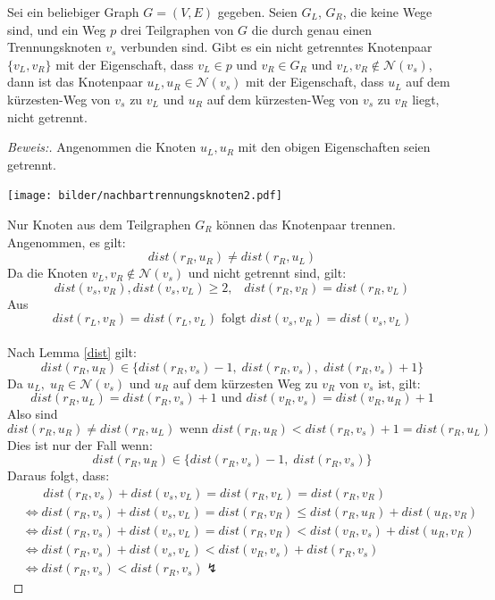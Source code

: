 \begin{lem}
\label{nachbartrennungsknoten2}
Sei ein beliebiger Graph $G=(V,E)$ gegeben. Seien $G_L$, $G_R$, die keine Wege sind, und ein Weg $p$ drei Teilgraphen von $G$ die durch genau einen Trennungsknoten $v_s$ verbunden sind. Gibt es ein nicht getrenntes Knotenpaar $\{v_L,v_R\}$ mit der Eigenschaft, dass $v_L\in p$ und $v_R \in G_R$ und $v_L, v_R \notin \mathcal{N}(v_s)$, dann ist das Knotenpaar $u_L,u_R \in \mathcal{N}(v_s)$ mit der Eigenschaft, dass $u_L$ auf dem kürzesten-Weg von $v_s$ zu $v_L$ und $u_R$ auf dem kürzesten-Weg von $v_s$ zu $v_R$ liegt, nicht getrennt.
\end{lem}
\par
\begin{proof}[Beweis:] Angenommen die Knoten $u_L,u_R$ mit den obigen Eigenschaften seien getrennt.
\begin{floatingfigure}[r]{200pt}
\centering
\texttt{[image: bilder/nachbartrennungsknoten2.pdf]}
\end{floatingfigure}
Nur Knoten aus dem Teilgraphen $G_R$ können das Knotenpaar trennen. Angenommen, es gilt: $$dist(r_R,u_R)\neq dist(r_R,u_L)$$
\newline
Da die Knoten $v_L, v_R \notin \mathcal{N}(v_s)$ und nicht getrennt sind, gilt: $$dist(v_s,v_R),dist(v_s,v_L)\geq 2,\;\;\; dist(r_R,v_R)=dist(r_R,v_L)$$ 
Aus $$dist(r_L,v_R)=dist(r_L,v_L) \text{ folgt }dist(v_s,v_R)=dist(v_s,v_L)$$\\
Nach Lemma \ref{dist} gilt: $$dist(r_R,u_R)\in \{dist(r_R,v_s)-1,\; dist(r_R,v_s),\;dist(r_R,v_s)+1\}$$
Da $u_L,\;u_R \in \mathcal{N}(v_s)$ und $u_R$ auf dem kürzesten Weg zu $v_R$ von $v_s$ ist, gilt: $$dist(r_R,u_L)=dist(r_R,v_s)+1\text{ und }dist(v_R,v_s)=dist(v_R,u_R)+1$$
Also sind $$dist(r_R,u_R)\neq dist(r_R,u_L)\text{ wenn }dist(r_R,u_R)<dist(r_R,v_s)+1=dist(r_R,u_L)$$
Dies ist nur der Fall wenn: $$dist(r_R,u_R)\in \{dist(r_R,v_s)-1,\; dist(r_R,v_s)\}$$
Daraus folgt, dass:
\begin{align*}
&\;\;\;\;\;\;dist(r_R,v_s)+dist(v_s,v_L)=dist(r_R,v_L)=dist(r_R,v_R)\\
&\Leftrightarrow  dist(r_R,v_s)+dist(v_s,v_L)=dist(r_R,v_R) \leq dist(r_R,u_R)+dist(u_R,v_R)\\
&\Leftrightarrow  dist(r_R,v_s)+dist(v_s,v_L)=dist(r_R,v_R)< dist(v_R,v_s)+dist(u_R,v_R)\\
&\Leftrightarrow  dist(r_R,v_s)+dist(v_s,v_L)< dist(v_R,v_s)+dist(r_R,v_s)\\
&\Leftrightarrow  dist(r_R,v_s)<dist(r_R,v_s)\lightning
\end{align*}
\end{proof}
\par
